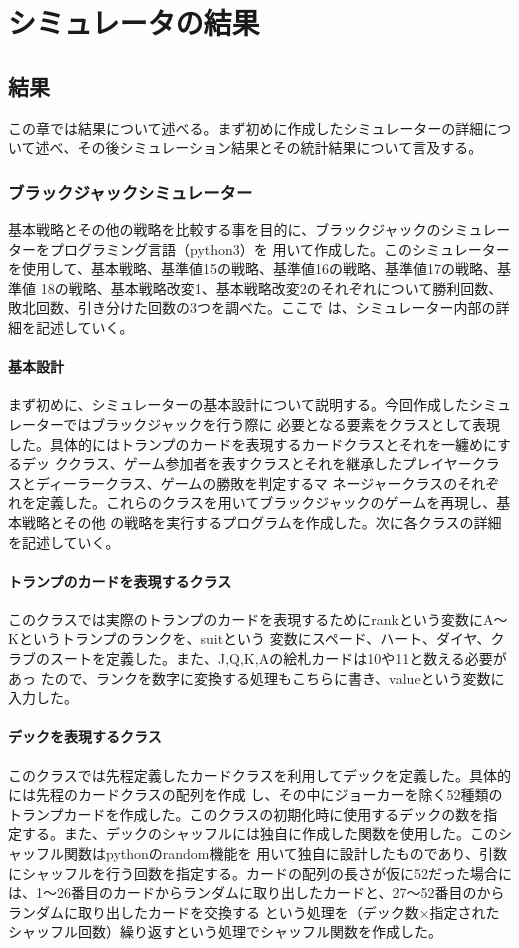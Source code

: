 \chapter{シミュレータの結果}
\section{結果}
この章では結果について述べる。まず初めに作成したシミュレーターの詳細について述べ、その後シミュレーション結果とその統計結果について言及する。

\subsection{ブラックジャックシミュレーター}
基本戦略とその他の戦略を比較する事を目的に、ブラックジャックのシミュレーターをプログラミング言語（python3）を
用いて作成した。このシミュレーターを使用して、基本戦略、基準値15の戦略、基準値16の戦略、基準値17の戦略、基準値
18の戦略、基本戦略改変1、基本戦略改変2のそれぞれについて勝利回数、敗北回数、引き分けた回数の3つを調べた。ここで
は、シミュレーター内部の詳細を記述していく。

\subsubsection{基本設計}
まず初めに、シミュレーターの基本設計について説明する。今回作成したシミュレーターではブラックジャックを行う際に
必要となる要素をクラスとして表現した。具体的にはトランプのカードを表現するカードクラスとそれを一纏めにするデッ
ククラス、ゲーム参加者を表すクラスとそれを継承したプレイヤークラスとディーラークラス、ゲームの勝敗を判定するマ
ネージャークラスのそれぞれを定義した。これらのクラスを用いてブラックジャックのゲームを再現し、基本戦略とその他
の戦略を実行するプログラムを作成した。次に各クラスの詳細を記述していく。

\subsubsection{トランプのカードを表現するクラス}
このクラスでは実際のトランプのカードを表現するためにrankという変数にA～Kというトランプのランクを、suitという
変数にスペード、ハート、ダイヤ、クラブのスートを定義した。また、J,Q,K,Aの絵札カードは10や11と数える必要があっ
たので、ランクを数字に変換する処理もこちらに書き、valueという変数に入力した。

\subsubsection{デックを表現するクラス}
このクラスでは先程定義したカードクラスを利用してデックを定義した。具体的には先程のカードクラスの配列を作成
し、その中にジョーカーを除く52種類のトランプカードを作成した。このクラスの初期化時に使用するデックの数を指
定する。また、デックのシャッフルには独自に作成した関数を使用した。このシャッフル関数はpythonのrandom機能を
用いて独自に設計したものであり、引数にシャッフルを行う回数を指定する。カードの配列の長さが仮に52だった場合に
は、1～26番目のカードからランダムに取り出したカードと、27～52番目のからランダムに取り出したカードを交換する
という処理を（デック数×指定されたシャッフル回数）繰り返すという処理でシャッフル関数を作成した。

